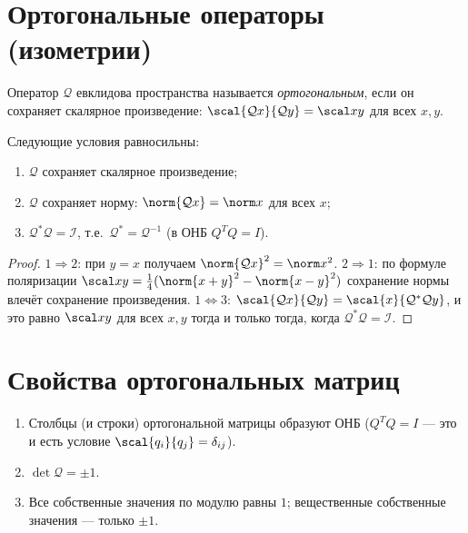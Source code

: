 \section{Ортогональные операторы (изометрии)}

\begin{definition}
Оператор $\mathcal Q$ евклидова пространства называется \emph{ортогональным}, если он сохраняет
скалярное произведение: $\scal{\mathcal Qx}{\mathcal Qy}=\scal xy$ для всех $x,y$.
\end{definition}

\begin{theorem}
Следующие условия равносильны:
\begin{enumerate}[label=\arabic*),leftmargin=*,nosep]
  \item $\mathcal Q$ сохраняет скалярное произведение;
  \item $\mathcal Q$ сохраняет норму: $\norm{\mathcal Qx}=\norm x$ для всех $x$;
  \item $\mathcal Q^*\mathcal Q=\mathcal I$, т.е.\ $\mathcal Q^*=\mathcal Q^{-1}$ (в ОНБ
        $Q^{T}Q=I$).
\end{enumerate}
\end{theorem}

\begin{proof}
$1\Rightarrow2$: при $y=x$ получаем $\norm{\mathcal Qx}^2=\norm x^2$. $2\Rightarrow1$: по формуле
поляризации $\scal xy=\tfrac14(\norm{x+y}^2-\norm{x-y}^2)$ сохранение нормы влечёт сохранение
произведения. $1\Leftrightarrow3$: $\scal{\mathcal Qx}{\mathcal Qy}=\scal{x}{\mathcal Q^*\mathcal Qy}$,
и это равно $\scal xy$ для всех $x,y$ тогда и только тогда, когда $\mathcal Q^*\mathcal Q=\mathcal I$.
\end{proof}

\section{Свойства ортогональных матриц}

\begin{property}\leavevmode
\begin{enumerate}[label=\arabic*),leftmargin=*,nosep]
  \item Столбцы (и строки) ортогональной матрицы образуют ОНБ ($Q^{T}Q=I$ — это и есть условие
        $\scal{q_i}{q_j}=\delta_{ij}$).
  \item $\det\mathcal Q=\pm1$.
  \item Все собственные значения по модулю равны $1$; вещественные собственные значения — только
        $\pm1$.
\end{enumerate}
\end{property}

